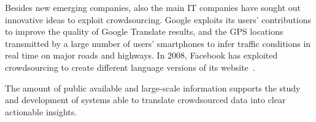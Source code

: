 Besides new emerging companies, also the main IT companies have sought out innovative ideas to exploit crowdsourcing. Google exploits its users' contributions to improve the quality of Google Translate results, and the GPS locations transmitted by a large number of users' smartphones to infer traffic conditions in real time on major roads and highways. 
In 2008, Facebook has exploited crowdsourcing to create different language versions of its website~\cite{dolmaya2011ethics}. %

The amount of public available and large-scale information supports the study and development of systems able to translate crowdsourced data into clear actionable insights.